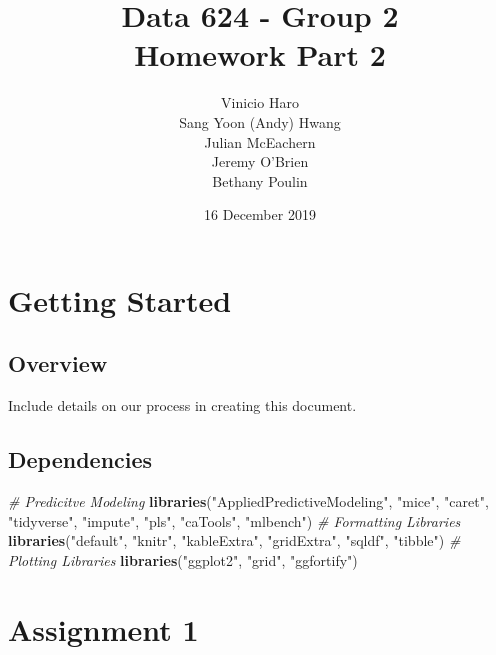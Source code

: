 \documentclass[]{report}
\title{Data 624 - Group 2\\
Homework Part 2}
\author{Vinicio Haro \\ Sang Yoon (Andy) Hwang \\ Julian McEachern \\ Jeremy O'Brien \\ Bethany Poulin}
\date{16 December 2019}
\newenvironment{Shaded}{\begin{snugshade}}{\end{snugshade}}
\newcommand{\CommentTok}[1]{\textcolor[rgb]{0.56,0.35,0.01}{\textit{#1}}}
\newcommand{\KeywordTok}[1]{\textcolor[rgb]{0.13,0.29,0.53}{\textbf{#1}}}
\newcommand{\NormalTok}[1]{#1}
\newcommand{\StringTok}[1]{\textcolor[rgb]{0.31,0.60,0.02}{#1}}
\begin{document}
\maketitle

{
\setcounter{tocdepth}{2}
\tableofcontents
}
\hypertarget{Overview}{%
\chapter*{Getting Started}\label{Overview}}

\hypertarget{overview}{%
\section{Overview}\label{overview}}

Include details on our process in creating this document.

\hypertarget{dependencies}{%
\section{Dependencies}\label{dependencies}}

\begin{Shaded}
\begin{Highlighting}[]
\CommentTok{# Predicitve Modeling}
\KeywordTok{libraries}\NormalTok{(}\StringTok{"AppliedPredictiveModeling"}\NormalTok{, }\StringTok{"mice"}\NormalTok{, }\StringTok{"caret"}\NormalTok{, }\StringTok{"tidyverse"}\NormalTok{, }
    \StringTok{"impute"}\NormalTok{, }\StringTok{"pls"}\NormalTok{, }\StringTok{"caTools"}\NormalTok{, }\StringTok{"mlbench"}\NormalTok{)}
\CommentTok{# Formatting Libraries}
\KeywordTok{libraries}\NormalTok{(}\StringTok{"default"}\NormalTok{, }\StringTok{"knitr"}\NormalTok{, }\StringTok{"kableExtra"}\NormalTok{, }\StringTok{"gridExtra"}\NormalTok{, }\StringTok{"sqldf"}\NormalTok{, }
    \StringTok{"tibble"}\NormalTok{)}
\CommentTok{# Plotting Libraries}
\KeywordTok{libraries}\NormalTok{(}\StringTok{"ggplot2"}\NormalTok{, }\StringTok{"grid"}\NormalTok{, }\StringTok{"ggfortify"}\NormalTok{)}
\end{Highlighting}
\end{Shaded}

\newpage

\hypertarget{AS-1}{%
\chapter*{Assignment 1}\label{AS-1}}
\end{document}
